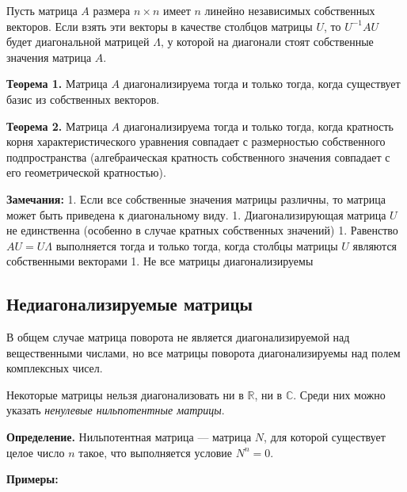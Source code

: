 \documentclass[11pt,a4paper]{article}
\begin{document}
Пусть матрица \(A\) размера \(n \times n\) имеет \(n\) линейно
независимых собственных векторов. Если взять эти векторы в качестве
столбцов матрицы \(U\), то \(U^{-1}AU\) будет диагональной матрицей
\(\Lambda\), у которой на диагонали стоят собственные значения матрица
\(A\).

\textbf{Теорема 1.} Матрица \(A\) диагонализируема тогда и только тогда,
когда существует базис из собственных векторов.

\textbf{Теорема 2.} Матрица \(A\) диагонализируема тогда и только тогда,
когда кратность корня характеристического уравнения совпадает с
размерностью собственного подпространства (алгебраическая кратность
собственного значения совпадает с его геометрической кратностью).

\textbf{Замечания:} 1. Если все собственные значения матрицы различны,
то матрица может быть приведена к диагональному виду. 1.
Диагонализирующая матрица \(U\) не единственна (особенно в случае кратных
собственных значений) 1. Равенство \(AU = U\Lambda\) выполняется тогда и
только тогда, когда столбцы матрицы \(U\) являются собственными
векторами 1. Не все матрицы диагонализируемы

    \hypertarget{ux43dux435ux434ux438ux430ux433ux43eux43dux430ux43bux438ux437ux438ux440ux443ux435ux43cux44bux435-ux43cux430ux442ux440ux438ux446ux44b}{%
\subsection{Недиагонализируемые
матрицы}\label{ux43dux435ux434ux438ux430ux433ux43eux43dux430ux43bux438ux437ux438ux440ux443ux435ux43cux44bux435-ux43cux430ux442ux440ux438ux446ux44b}}

В общем случае матрица поворота не является диагонализируемой над
вещественными числами, но все матрицы поворота диагонализируемы над
полем комплексных чисел.

Некоторые матрицы нельзя диагонализовать ни в \(\mathbb{R}\), ни в
\(\mathbb{C}\). Среди них можно указать \emph{ненулевые нильпотентные
матрицы}.

\textbf{Определение.} Нильпотентная матрица --- матрица \(N\), для
которой существует целое число \(n\) такое, что выполняется условие
\(N^n=0\).

\textbf{Примеры:}
\end{document}
